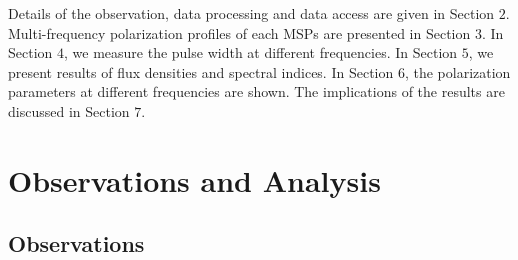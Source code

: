 \documentclass[useAMS,usenatbib]{mn2e}
\begin{document}
Details of the observation, data processing and data access are given in 
Section $2$. Multi-frequency polarization profiles of each MSPs are presented 
in Section $3$.
%
In Section $4$, we measure the pulse width at different frequencies.
%
In Section $5$, we present results of flux densities and spectral indices.
%
In Section $6$, the polarization parameters at different frequencies are 
shown.
%
The implications of the results are discussed in Section $7$.





\section{Observations and Analysis}

\subsection{Observations}
\end{document}

